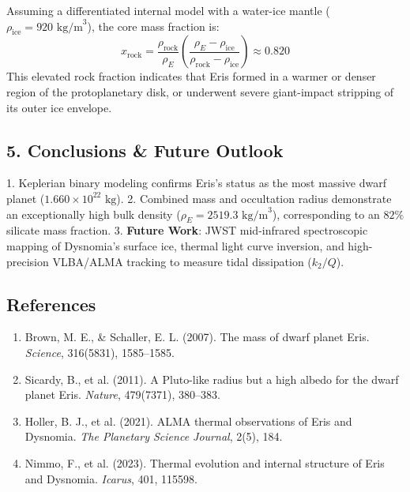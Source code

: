 \documentclass[11pt,a4paper]{article}
\begin{document}
Assuming a differentiated internal model with a water-ice mantle ($\rho_{\text{ice}} = 920\text{ kg/m}^3$), the core mass fraction is:
\begin{equation}
x_{\text{rock}} = \frac{\rho_{\text{rock}}}{\rho_E} \left( \frac{\rho_E - \rho_{\text{ice}}}{\rho_{\text{rock}} - \rho_{\text{ice}}} \right) \approx 0.820
\end{equation}
This elevated rock fraction indicates that Eris formed in a warmer or denser region of the protoplanetary disk, or underwent severe giant-impact stripping of its outer ice envelope.

\subsection*{5. Conclusions \& Future Outlook}
1. Keplerian binary modeling confirms Eris's status as the most massive dwarf planet ($1.660 \times 10^{22}\text{ kg}$).
2. Combined mass and occultation radius demonstrate an exceptionally high bulk density ($\rho_E = 2519.3\text{ kg/m}^3$), corresponding to an $82\%$ silicate mass fraction.
3. \textbf{Future Work}: JWST mid-infrared spectroscopic mapping of Dysnomia's surface ice, thermal light curve inversion, and high-precision VLBA/ALMA tracking to measure tidal dissipation ($k_2/Q$).

\subsection*{References}
\begin{enumerate}
    \item Brown, M. E., \& Schaller, E. L. (2007). The mass of dwarf planet Eris. \textit{Science}, 316(5831), 1585--1585.
    \item Sicardy, B., et al. (2011). A Pluto-like radius but a high albedo for the dwarf planet Eris. \textit{Nature}, 479(7371), 380--383.
    \item Holler, B. J., et al. (2021). ALMA thermal observations of Eris and Dysnomia. \textit{The Planetary Science Journal}, 2(5), 184.
    \item Nimmo, F., et al. (2023). Thermal evolution and internal structure of Eris and Dysnomia. \textit{Icarus}, 401, 115598.
\end{enumerate}

\newpage

\end{document}
